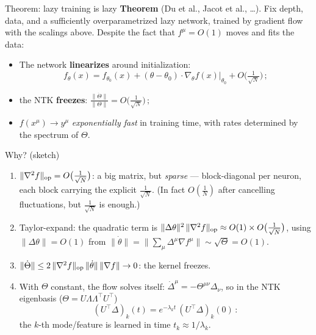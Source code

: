 \documentclass[11pt]{beamer}
\newcommand{\hl}[1]{{\color{blue!60!black}\textbf{#1}}}
\begin{document}
\begin{frame}{Theorem: lazy training is lazy}
  \textbf{Theorem} (Du et al., Jacot et al., \dots). Fix depth, data,
  and a sufficiently overparametrized lazy network, trained by gradient
  flow with the scalings above. Despite the fact that $f^\mu = O(1)$
  moves and fits the data:
  \begin{itemize}
    \item The network \hl{linearizes} around initialization:
      \[
        f_\theta(x) = f_{\theta_0}(x)
        + (\theta - \theta_0)\cdot \nabla_\theta f(x)\big|_{\theta_0}
        + O\Big(\tfrac{1}{\sqrt N}\Big)\,;
      \]
    \item the NTK \hl{freezes}:
      $\displaystyle \frac{\|\dot\Theta\|}{\|\Theta\|} =
      O\Big(\frac{1}{\sqrt N}\Big)\,;$
    \medskip
    \item $f(x^\mu) \to y^\mu$ \emph{exponentially fast} in training
      time, with rates determined by the spectrum of $\Theta$.
  \end{itemize}
\end{frame}

\begin{frame}{Why? (sketch)}
  \begin{enumerate}
    \item $\|\nabla^2 f\|_{\rm op} = O\big(\tfrac{1}{\sqrt N}\big)$: a
      big matrix, but \emph{sparse} --- block-diagonal per neuron, each
      block carrying the explicit $\tfrac{1}{\sqrt N}$. (In fact
      $O(\tfrac1N)$ after cancelling fluctuations, but $\tfrac{1}{\sqrt
      N}$ is enough.)
    \item Taylor-expand: the quadratic term is
      $\|\Delta\theta\|^2\,\|\nabla^2 f\|_{\rm op} \approx O(1)\times
      O\big(\tfrac{1}{\sqrt N}\big)$, using $\|\Delta\theta\| =
      O(1)$ from $\|\dot\theta\| = \|\sum_\mu \Delta^\mu \nabla f^\mu\|
      \sim \sqrt{\Theta} = O(1)$.
    \item $\|\dot\Theta\| \leq 2\,\|\nabla^2 f\|_{\rm op}\,
      \|\dot\theta\|\,\|\nabla f\| \to 0$: the kernel freezes.
    \item With $\Theta$ constant, the flow solves itself:
      $\dot\Delta^\mu = -\Theta^{\mu\nu}\Delta_\nu$, so in the
      NTK eigenbasis ($\Theta = U\Lambda\Lambda^\top U^\top$)
      \[
        (U^{\!\top}\Delta)_k(t) = e^{-\lambda_k t}\,
        (U^{\!\top}\Delta)_k(0)\,:
      \]
      the $k$-th mode/feature is learned in  time
      $\boxed{t_k \approx 1/\lambda_k}$.
  \end{enumerate}
\end{frame}
\end{document}

